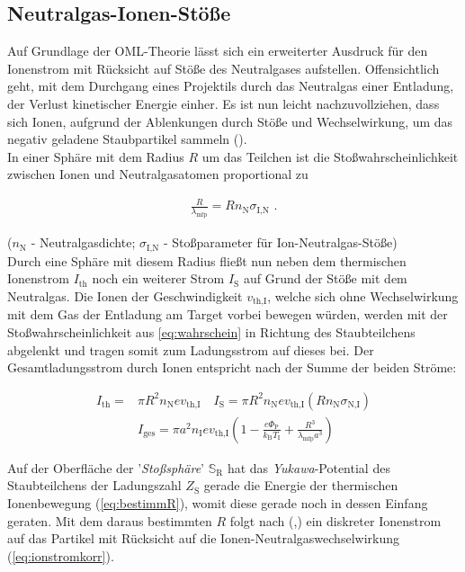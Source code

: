 \documentclass[numbers=noenddot,a4paper,notitlepage,twoside,BCOR15mm]{scrbook}
\newcommand{\ix}[1]{_\text{#1}}
\newcommand{\tilt}[1]{\textit{#1}}
\begin{document}
			\subsection{Neutralgas-Ionen-Stöße}

			Auf Grundlage der OML-Theorie lässt sich ein erweiterter Ausdruck für den Ionenstrom mit Rücksicht auf Stöße des Neutralgases aufstellen. Offensichtlich geht, mit dem Durchgang eines Projektils durch das Neutralgas einer Entladung, der Verlust kinetischer Energie einher. Es ist nun leicht nachzuvollziehen, dass sich Ionen, aufgrund der Ablenkungen durch Stöße und Wechselwirkung, um das negativ geladene Staubpartikel sammeln (\cite{Goree92}).\\
            In einer Sphäre mit dem Radius $R$ um das Teilchen ist die Stoßwahrscheinlichkeit zwischen Ionen und Neutralgasatomen proportional zu

				\begin{align}
					\frac{R}{\lambda\ix{mfp}}=Rn\ix{N}\sigma\ix{I,N} \,\, . \label{eq:wahrschein}
				\end{align}

			($n\ix{N}$ - Neutralgasdichte; $\sigma\ix{I,N}$ - Stoßparameter für Ion-Neutralgas-Stöße)\\
			Durch eine Sph\"are mit diesem Radius flie{\ss}t nun neben dem thermischen Ionenstrom $I\ix{th}$ noch ein weiterer Strom $I\ix{S}$ auf Grund der St\"o{\ss}e mit dem Neutralgas. Die Ionen der Geschwindigkeit $v\ix{th,I}$, welche sich ohne Wechselwirkung mit dem Gas der Entladung am Target vorbei bewegen w\"urden, werden mit der Sto{\ss}wahrscheinlichkeit aus \autoref{eq:wahrschein} in Richtung des Staubteilchens abgelenkt und tragen somit zum Ladungsstrom auf dieses bei. Der Gesamtladungsstrom durch Ionen entspricht nach \cite{Lampe01} der Summe der beiden Str\"ome:

				\begin{align}
					I\ix{th}=&\pi R^{2}n\ix{N}ev\ix{th,I} \quad I\ix{S}=\pi R^2n\ix{N}ev\ix{th,I}\left(Rn\ix{N}\sigma\ix{N,I}\right) \\
					&I\ix{ges}=\pi a^{2}n\ix{I}ev\ix{th,I}\left(1-\frac{e\Phi\ix{P}}{k\ix{B}T\ix{I}}+\frac{R^{3}}{\lambda\ix{mfp}a^{3}}\right)
				\end{align}

			Auf der Oberfl\"ache der '\tilt{Sto{\ss}sph\"are}' $\mathbb{S}\ix{R}$ hat das \tilt{Yukawa}-Potential des Staubteilchens der Ladungszahl $Z\ix{S}$ gerade die Energie der thermischen Ionenbewegung (\autoref{eq:bestimmR}), womit diese gerade noch in dessen Einfang geraten. Mit dem daraus bestimmten $R$ folgt nach (\cite{Melzer12},\cite{Khrapak05a}) ein diskreter Ionenstrom auf das Partikel mit R\"ucksicht auf die Ionen-Neutralgaswechselwirkung (\autoref{eq:ionstromkorr}).
\end{document}
